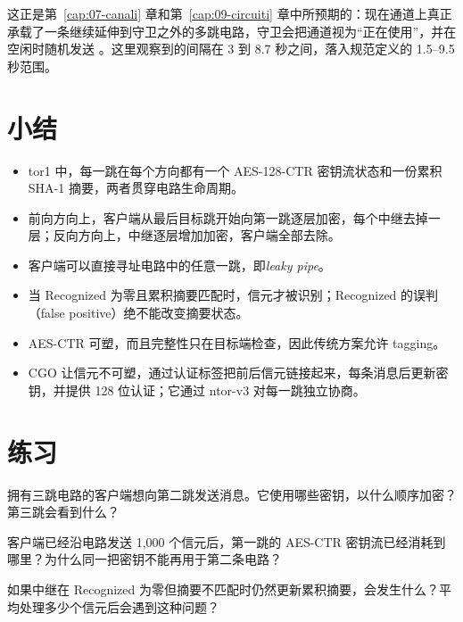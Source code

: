 这正是第~\ref{cap:07-canali} 章和第~\ref{cap:09-circuiti} 章中所预期的：现在通道上真正承载了一条继续延伸到守卫之外的多跳电路，守卫会把通道视为\enquote{正在使用}，并在空闲时随机发送 。这里观察到的间隔在 3 到 8.7 秒之间，落入规范定义的 1.5--9.5 秒范围。

\section*{小结}
\begin{itemize}
  \item tor1 中，每一跳在每个方向都有一个 AES-128-CTR 密钥流状态和一份累积 SHA-1 摘要，两者贯穿电路生命周期。
  \item 前向方向上，客户端从最后目标跳开始向第一跳逐层加密，每个中继去掉一层；反向方向上，中继逐层增加加密，客户端全部去除。
  \item 客户端可以直接寻址电路中的任意一跳，即\emph{leaky pipe}。
  \item 当 Recognized 为零且累积摘要匹配时，信元才被识别；Recognized 的误判（false positive）绝不能改变摘要状态。
  \item AES-CTR 可塑，而且完整性只在目标端检查，因此传统方案允许 tagging。
  \item CGO 让信元不可塑，通过认证标签把前后信元链接起来，每条消息后更新密钥，并提供 128 位认证；它通过 ntor-v3 对每一跳独立协商。
\end{itemize}

\section*{练习}

\begin{esercizio}[1]\label{es:10-ordine}
拥有三跳电路的客户端想向第二跳发送消息。它使用哪些密钥，以什么顺序加密？第三跳会看到什么？
\end{esercizio}

\begin{esercizio}[1]\label{es:10-contatore}
客户端已经沿电路发送 1,000 个信元后，第一跳的 AES-CTR 密钥流已经消耗到哪里？为什么同一把密钥不能再用于第二条电路？
\end{esercizio}

\begin{esercizio}[2]\label{es:10-falso}
如果中继在 Recognized 为零但摘要不匹配时仍然更新累积摘要，会发生什么？平均处理多少个信元后会遇到这种问题？
\end{esercizio}


